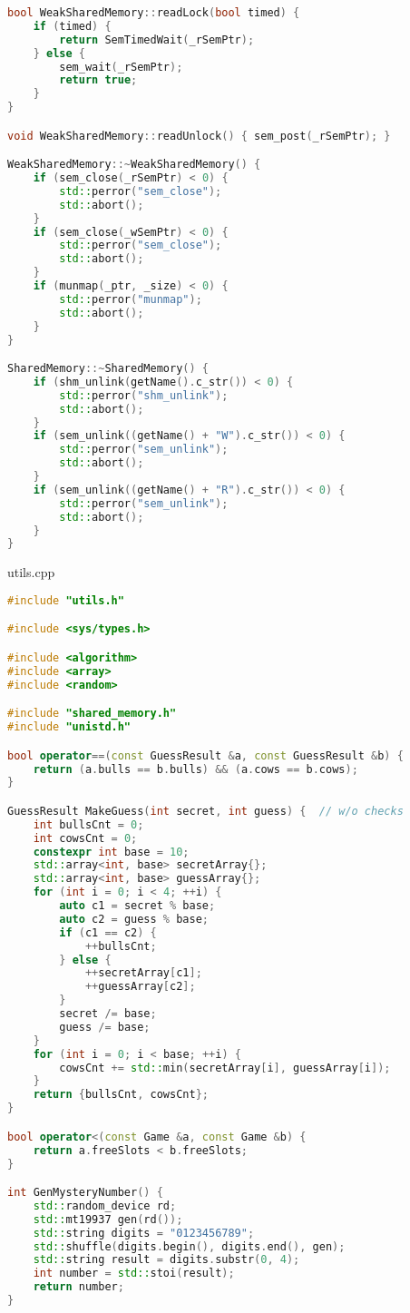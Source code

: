\documentclass[a4paper, 12pt]{article}
\begin{document}
\begin{lstlisting}[language=C++]
bool WeakSharedMemory::readLock(bool timed) {
    if (timed) {
        return SemTimedWait(_rSemPtr);
    } else {
        sem_wait(_rSemPtr);
        return true;
    }
}

void WeakSharedMemory::readUnlock() { sem_post(_rSemPtr); }

WeakSharedMemory::~WeakSharedMemory() {
    if (sem_close(_rSemPtr) < 0) {
        std::perror("sem_close");
        std::abort();
    }
    if (sem_close(_wSemPtr) < 0) {
        std::perror("sem_close");
        std::abort();
    }
    if (munmap(_ptr, _size) < 0) {
        std::perror("munmap");
        std::abort();
    }
}

SharedMemory::~SharedMemory() {
    if (shm_unlink(getName().c_str()) < 0) {
        std::perror("shm_unlink");
        std::abort();
    }
    if (sem_unlink((getName() + "W").c_str()) < 0) {
        std::perror("sem_unlink");
        std::abort();
    }
    if (sem_unlink((getName() + "R").c_str()) < 0) {
        std::perror("sem_unlink");
        std::abort();
    }
}
\end{lstlisting}

utils.cpp
\begin{lstlisting}[language=C++]
#include "utils.h"

#include <sys/types.h>

#include <algorithm>
#include <array>
#include <random>

#include "shared_memory.h"
#include "unistd.h"

bool operator==(const GuessResult &a, const GuessResult &b) {
    return (a.bulls == b.bulls) && (a.cows == b.cows);
}

GuessResult MakeGuess(int secret, int guess) {  // w/o checks
    int bullsCnt = 0;
    int cowsCnt = 0;
    constexpr int base = 10;
    std::array<int, base> secretArray{};
    std::array<int, base> guessArray{};
    for (int i = 0; i < 4; ++i) {
        auto c1 = secret % base;
        auto c2 = guess % base;
        if (c1 == c2) {
            ++bullsCnt;
        } else {
            ++secretArray[c1];
            ++guessArray[c2];
        }
        secret /= base;
        guess /= base;
    }
    for (int i = 0; i < base; ++i) {
        cowsCnt += std::min(secretArray[i], guessArray[i]);
    }
    return {bullsCnt, cowsCnt};
}

bool operator<(const Game &a, const Game &b) {
    return a.freeSlots < b.freeSlots;
}

int GenMysteryNumber() {
    std::random_device rd;
    std::mt19937 gen(rd());
    std::string digits = "0123456789";
    std::shuffle(digits.begin(), digits.end(), gen);
    std::string result = digits.substr(0, 4);
    int number = std::stoi(result);
    return number;
}
\end{lstlisting}
\end{document}
